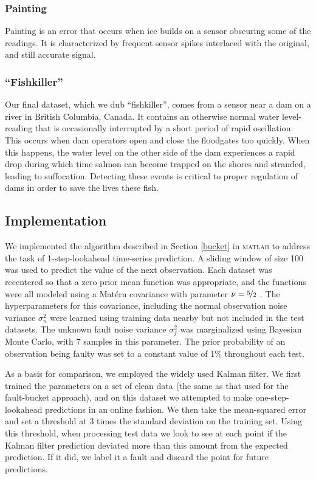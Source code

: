 \documentclass{article}
\begin{document}
\subsubsection{Painting}
Painting is an error that occurs when ice builds on a sensor obscuring
some of the readings. It is characterized by frequent sensor spikes
interlaced with the original, and still accurate signal.

\subsubsection{``Fishkiller''}
Our final dataset, which we dub ``fishkiller'', comes from a sensor
near a dam on a river in British Columbia, Canada. It contains an
otherwise normal water level-reading that is occasionally interrupted
by a short period of rapid oscillation. This occurs when dam operators
open and close the floodgates too quickly. When this happens, the
water level on the other side of the dam experiences a rapid drop
during which time salmon can become trapped on the shores and
stranded, leading to suffocation. Detecting these events is critical
to proper regulation of dams in order to save the lives these fish.

\subsection{Implementation}

We implemented the algorithm described in Section \ref{bucket} in
\textsc{matlab} to address the task of 1-step-lookahead time-series
prediction.  A sliding window of size 100 was used to predict the
value of the next observation.  Each dataset was recentered so that a
zero prior mean function was appropriate, and the functions were all
modeled using a Mat\'{e}rn covariance with parameter $\nu =
\nicefrac{5}{2}$ \citep{gpml}.  The hyperparameters for this
covariance, including the normal observation noise variance
$\sigma_n^2$ were learned using training data nearby but not included
in the test datasets.  The unknown fault noise variance $\sigma_f^2$
was marginalized using Bayesian Monte Carlo, with 7 samples in this
parameter.  The prior probability of an observation being faulty was
set to a constant value of 1\% throughout each test.

As a basis for comparison, we employed the widely used Kalman
filter. We first trained the parameters on a set of clean data (the
same as that used for the fault-bucket approach), and on this dataset
we attempted to make one-step-lookahead predictions in an online
fashion. We then take the mean-squared error and set a threshold at 3
times the standard deviation on the training set. Using this
threshold, when processing test data we look to see at each point if
the Kalman filter prediction deviated more than this amount from the
expected prediction. If it did, we label it a fault and discard the
point for future predictions.
\end{document}
